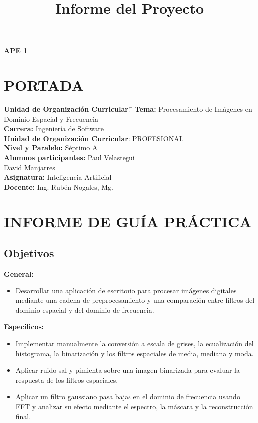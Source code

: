\documentclass[11pt]{article}
\title{Informe del Proyecto}
\begin{document}
\renewcommand{\figurename}{Figura}
\renewcommand{\thesection}{\Roman{section}}
\begin{center}
    \textbf{\underline{\normalsize APE 1}}
\end{center}

\section{PORTADA}

\begin{tabbing}
    \textbf{Unidad de Organización Curricular:}\hspace{1cm} \= \kill
    \textbf{Tema:} \> Procesamiento de Imágenes en Dominio Espacial y Frecuencia \\[0.25em]
    \textbf{Carrera:} \> Ingeniería de Software \\[0.25em]
    \textbf{Unidad de Organización Curricular:} \> PROFESIONAL \\[0.25em]
    \textbf{Nivel y Paralelo:} \> Séptimo A \\[0.25em]
    \textbf{Alumnos participantes:} \> Paul Velastegui \\
    \> David Manjarres \\[0.25em]
    \textbf{Asignatura:} \> Inteligencia Artificial \\[0.25em]
    \textbf{Docente:} \> Ing. Rubén Nogales, Mg.
\end{tabbing}

\section{INFORME DE GUÍA PRÁCTICA}
\renewcommand{\thesection}{\arabic{section}}

\subsection{Objetivos}
\textbf{General:}
\begin{itemize}
    \item Desarrollar una aplicación de escritorio para procesar imágenes digitales mediante una cadena de preprocesamiento y una comparación entre filtros del dominio espacial y del dominio de frecuencia.
\end{itemize}

\textbf{Específicos:}
\begin{itemize}
    \item Implementar manualmente la conversión a escala de grises, la ecualización del histograma, la binarización y los filtros espaciales de media, mediana y moda.
    \item Aplicar ruido sal y pimienta sobre una imagen binarizada para evaluar la respuesta de los filtros espaciales.
    \item Aplicar un filtro gaussiano pasa bajas en el dominio de frecuencia usando FFT y analizar su efecto mediante el espectro, la máscara y la reconstrucción final.
\end{itemize}
\end{document}
